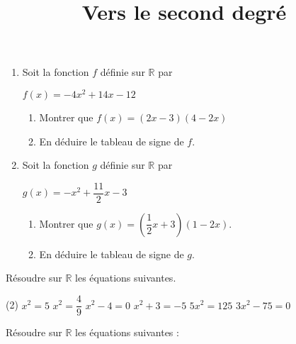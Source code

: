 \documentclass{exercice}
\title{Vers le second degré}
\begin{document}
\maketitle


\vspace{-1cm}

\begin{multicols*}{2}
\begin{exo}
  \begin{enumerate}[nosep]
  \item Soit la fonction $f$ définie sur $\mathbb{R}$ par \\
    \centerline{$f(x) = -4x^2 + 14x - 12$}
    \begin{enumerate}
    \item Montrer que $f(x) = (2x - 3)(4 - 2x)$
    \item En déduire le tableau de signe de $f$.
    \end{enumerate}
  \item Soit la fonction $g$ définie sur $\mathbb{R}$ par \\
    \centerline{$g(x) = -x^2 + \dfrac{11}{2}x - 3$}
    \begin{enumerate}[nosep]
    \item Montrer que $g(x) = \left( \dfrac{1}{2}x + 3 \right) (1 - 2 x)$.
    \item En déduire le tableau de signe de $g$. 
    \end{enumerate}
  \end{enumerate}
\end{exo}

\begin{exo}
  Résoudre sur $\mathbb{R}$ les équations suivantes. 

  \begin{tasks}(2)
    \task $x^2 = 5$
    \task $x ^2 = \dfrac{4}{9}$
    \task $x^2 - 4 = 0$
    \task $x^2 + 3 = -5$
    \task $5x^2 = 125$
    \task $3x^2 - 75 = 0$
  \end{tasks}
\end{exo}

\begin{exo}
  Résoudre sur $\mathbb{R}$ les équations suivantes :


\end{exo}
\end{multicols*}
\end{document}
